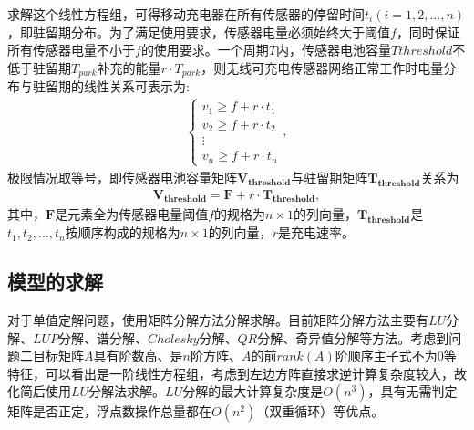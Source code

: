 \documentclass{whutmod}
\begin{document}
\begin{table}[H]
\begin{tablenotes}
			求解这个线性方程组，可得移动充电器在所有传感器的停留时间$t_i(i=1,2,...,n)$，即驻留期分布。为了满足使用要求，传感器电量必须始终大于阈值$f$，同时保证所有传感器电量不小于$f$的使用要求。一个周期$T$内，传感器电池容量$T{threshold}$不低于驻留期$T_{park}$补充的能量$r \cdot T_{park}$，则无线可充电传感器网络正常工作时电量分布与驻留期的线性关系可表示为:
			\begin{gather}
			\left\{\begin{matrix}
			v_1\geq f+r\cdot t_1\\ 
			v_2\geq f+r\cdot t_2\\ 
			\vdots \\ 
			v_n \geq f+r\cdot t_n
			\end{matrix}\right.,
			\end{gather}
			极限情况取等号，即传感器电池容量矩阵$\bm {V_{threshold}}$与驻留期矩阵$\bm {T_{threshold}}$关系为
			\begin{gather}
			\bm{V_{threshold}}=\bm{F}+r\cdot \bm{T_{threshold}},
			\end{gather}
			其中，$\bm F$是元素全为传感器电量阈值$f$的规格为$n \times 1$的列向量，$\bm{T_{threshold}}$是$t_1,t_2,...,t_{n}$按顺序构成的规格为$n\times 1$的列向量，$r$是充电速率。
    		
		
		\subsection{模型的求解}
		对于单值定解问题，使用矩阵分解方法分解求解。目前矩阵分解方法主要有$LU$分解、$LUP$分解、谱分解、$Cholesky$分解、$QR$分解、奇异值分解等方法。考虑到问题二目标矩阵$A$具有阶数高、是$n$阶方阵、$A$的前$rank(A)$阶顺序主子式不为$0$等特征，可以看出是一阶线性方程组，考虑到左边方阵直接求逆计算复杂度较大，故化简后使用$LU$分解法求解。$LU$分解的最大计算复杂度是$O(n^3)$，具有无需判定矩阵是否正定，浮点数操作总量都在$O(n^2)$（双重循环）等优点。
		

\end{tablenotes}
\end{table}
\end{document}
